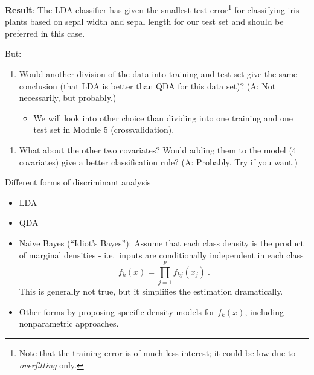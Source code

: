 \documentclass[10pt,ignorenonframetext,]{beamer}
\providecommand{\tightlist}{%
  \setlength{\itemsep}{0pt}\setlength{\parskip}{0pt}}
\begin{document}
\begin{frame}

\textbf{Result}: The LDA classifier has given the smallest test
error\footnote{Note that the training error is of much less interest; it could be low due to \emph{overfitting} only.}
for classifying iris plants based on sepal width and sepal length for
our test set and should be preferred in this case.

\vspace{2mm}

But:

\begin{enumerate}
\def\labelenumi{\arabic{enumi}.}
\tightlist
\item
  Would another division of the data into training and test set give the
  same conclusion (that LDA is better than QDA for this data set)? (A:
  Not necessarily, but probably.)

  \begin{itemize}
  \tightlist
  \item
    We will look into other choice than dividing into one training and
    one test set in Module 5 (crossvalidation).
  \end{itemize}
\end{enumerate}

\vspace{2mm}

\begin{enumerate}
\def\labelenumi{\arabic{enumi}.}
\setcounter{enumi}{1}
\tightlist
\item
  What about the other two covariates? Would adding them to the model (4
  covariates) give a better classification rule? (A: Probably. Try if
  you want.)
\end{enumerate}

\end{frame}

\begin{frame}

\begin{block}{Different forms of discriminant analysis}

\begin{itemize}
\item
  LDA
\item
  QDA
\item
  Naive Bayes (``Idiot's Bayes''): Assume that each class density is the
  product of marginal densities - i.e.~inputs are conditionally
  independent in each class \[f_k(x)=\prod_{j=1}^p f_{kj}(x_j) \ .\]
  This is generally not true, but it simplifies the estimation
  dramatically.
\item
  Other forms by proposing specific density models for \(f_k(x)\),
  including nonparametric approaches.
\end{itemize}

\end{block}

\end{frame}
\end{document}
